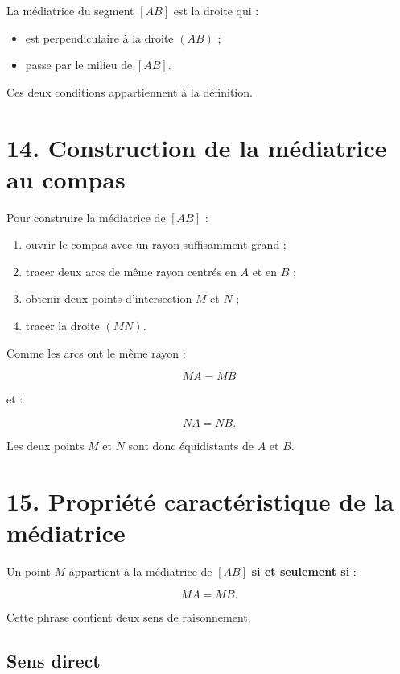 La médiatrice du segment $[AB]$ est la droite qui :

\begin{itemize}
\item est perpendiculaire à la droite $(AB)$ ;
\item passe par le milieu de $[AB]$.
\end{itemize}


Ces deux conditions appartiennent à la définition.

\section{14. Construction de la médiatrice au compas}

Pour construire la médiatrice de $[AB]$ :

\begin{enumerate}
\item ouvrir le compas avec un rayon suffisamment grand ;
\item tracer deux arcs de même rayon centrés en $A$ et en $B$ ;
\item obtenir deux points d’intersection $M$ et $N$ ;
\item tracer la droite $(MN)$.
\end{enumerate}

Comme les arcs ont le même rayon :

\[
MA=MB
\]

et :

\[
NA=NB.
\]

Les deux points $M$ et $N$ sont donc équidistants de $A$ et $B$.

\section{15. Propriété caractéristique de la médiatrice}

Un point $M$ appartient à la médiatrice de $[AB]$ \textbf{si et seulement si} :

\[
\boxed{MA=MB}.
\]

Cette phrase contient deux sens de raisonnement.

\subsection{Sens direct}

